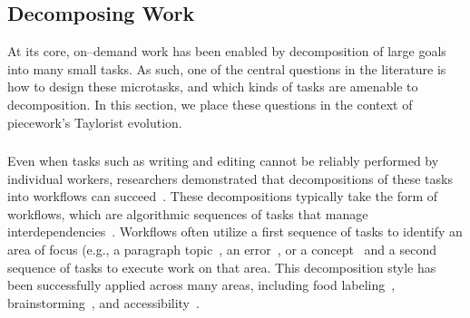 \documentclass[trackingWork]{subfiles}
\begin{document}
\subsection[How far can work be decomposed into smaller microtasks]{Decomposing Work}\label{sec:decomposition}

At its core,
on--demand work has been enabled by decomposition of large goals into many small tasks.
As such,
one of the central questions in the literature is how to design these microtasks,
and which kinds of tasks are amenable to decomposition.
In this section,
we place these questions in the context of piecework's Taylorist evolution.

\begin{comment}
Outline:
Crowd work
	- How do we take work and split it up into smaller work?
	- How small can we go?
	- Once we split up, what happens? Marketplace choosing
Piecework
	- How do we take work and split it up?
	[ - how small can we go? ]
	[- Nothing about how people choose. ]
Same/different
	[- task data science ]
	[- Cognitive barriers, task switching, etc, dominates]
	[ - Switching is different, marketplace model ]
\end{comment}

\subsubsection{\crowdworkpers}
Even when tasks such as writing and editing cannot be reliably performed by individual workers,
researchers demonstrated that
decompositions of these tasks into workflows can succeed~\cite{crowdForgeKittur,
                                                               bernsteinSoylent,
                                                               writingMicroTasks,
                                                               Nebeling:2016:WCW:2858036.2858169}. 
These decompositions typically take the form of workflows,
which are algorithmic sequences of tasks that manage interdependencies~\cite{Bigham2014}. 
Workflows often utilize a first sequence of tasks to identify an area of focus (e.g.,
a paragraph topic~\cite{crowdForgeKittur},
an error~\cite{bernsteinSoylent},
or a concept~\cite{Yu2016a,Yu2016b} and a second sequence of tasks to execute work on that area. 
This decomposition style has been successfully applied across many areas,
including food labeling~\cite{noronha2011platemate},
brainstorming~\cite{siangliulue2015toward,yu2014distributed},
and accessibility~\cite{lasecki2013chorus,lasecki2012real,Lasecki2011}.
\end{document}
